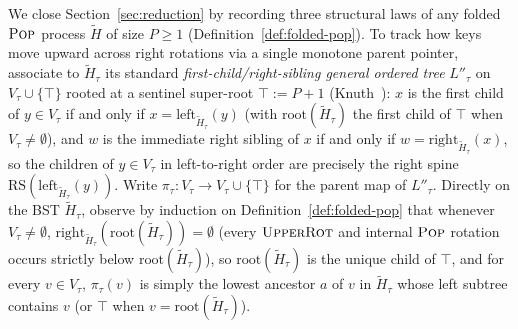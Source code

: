 \documentclass[11pt]{article}
\theoremstyle{definition}
\theoremstyle{remark}
\newcommand{\RS}{\mathrm{RS}}
\newcommand{\POP}{\textnormal{\scshape Pop}}
\newcommand{\UPROT}{\textnormal{\scshape UpperRot}}
\begin{document}
We close Section~\ref{sec:reduction} by recording three structural laws of any folded $\POP$ process $\widetilde{H}$ of size $P \ge 1$ (Definition~\ref{def:folded-pop}). To track how keys move upward across right rotations via a single monotone parent pointer, associate to $\widetilde{H}_\tau$ its standard \emph{first-child/right-sibling general ordered tree} $L''_\tau$ on $V_\tau \cup \{\top\}$ rooted at a sentinel super-root $\top := P + 1$ (Knuth~\cite[Section~2.3.2]{Knuth1997Vol1}): $x$ is the first child of $y \in V_\tau$ if and only if $x = \mathrm{left}_{\widetilde{H}_\tau}(y)$ (with $\mathrm{root}(\widetilde{H}_\tau)$ the first child of $\top$ when $V_\tau \ne \emptyset$), and $w$ is the immediate right sibling of $x$ if and only if $w = \mathrm{right}_{\widetilde{H}_\tau}(x)$, so the children of $y \in V_\tau$ in left-to-right order are precisely the right spine $\RS(\mathrm{left}_{\widetilde{H}_\tau}(y))$. Write $\pi_\tau : V_\tau \to V_\tau \cup \{\top\}$ for the parent map of $L''_\tau$. Directly on the BST $\widetilde{H}_\tau$, observe by induction on Definition~\ref{def:folded-pop} that whenever $V_\tau \ne \emptyset$, $\mathrm{right}_{\widetilde{H}_\tau}(\mathrm{root}(\widetilde{H}_\tau)) = \emptyset$ (every $\UPROT$ and internal $\POP$ rotation occurs strictly below $\mathrm{root}(\widetilde{H}_\tau)$), so $\mathrm{root}(\widetilde{H}_\tau)$ is the unique child of $\top$, and for every $v \in V_\tau$, $\pi_\tau(v)$ is simply the lowest ancestor $a$ of $v$ in $\widetilde{H}_\tau$ whose left subtree contains $v$ (or $\top$ when $v = \mathrm{root}(\widetilde{H}_\tau)$).
\end{document}
